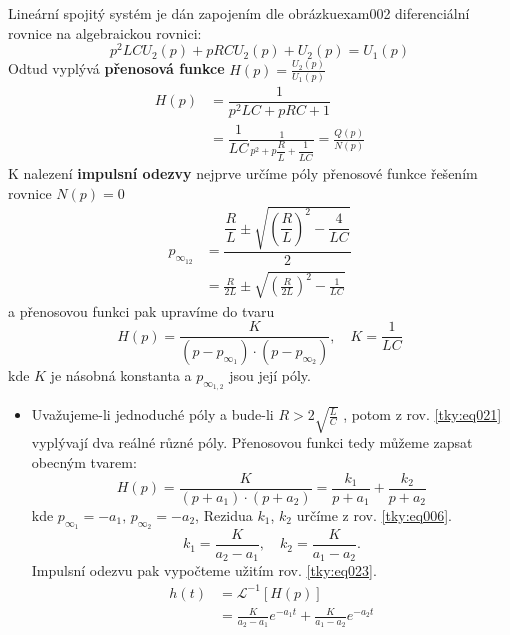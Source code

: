 \begin{tkyexam}{Lineární spojitý systém je dán zapojením dle obrázku}{exam002}
  diferenciální rovnice na algebraickou rovnici:
  \begin{equation*}
    p^2LCU_2(p)+pRCU_2(p)+U_2(p)=U_1(p)
  \end{equation*}
  Odtud vyplývá \textbf{přenosová funkce} $H(p)=\frac{U_2(p)}{U_1(p)}$
  \begin{align}
    H(p) &=\dfrac{1}{p^2LC+pRC+1}                                   \nonumber \\
          &=\dfrac{1}{LC}\frac{1}{p^2+p\dfrac{R}{L}+\dfrac{1}{LC}}
          =\frac{Q(p)}{N(p)}                                        \label{tky:eq020}
  \end{align}
  K nalezení \textbf{impulsní odezvy} nejprve určíme póly přenosové funkce řešením rovnice
  $N(p)=0$
  \begin{align}
    p_{\infty_{12}} 
      &=\dfrac{\dfrac{R}{L}\pm\sqrt{\left(\dfrac{R}{L}\right)^2-\dfrac{4}{LC}}}{2}   \nonumber \\
      &=\frac{R}{2L}\pm\sqrt{\left(\frac{R}{2L}\right)^2-\frac{1}{LC}}          \label{tky:eq021}
  \end{align}
  a přenosovou funkci pak upravíme do tvaru
  \begin{equation*}
    H(p)=\frac{K}{(p-p_{\infty_1})\cdot(p-p_{\infty_2})}, \quad K=\frac{1}{LC}
  \end{equation*}
  kde \(K\) je násobná konstanta a \(p_{\infty_{1,2}}\) jsou její póly. 
  \begin{itemize}[leftmargin=12pt,noitemsep]
    \item Uvažujeme-li jednoduché póly a bude-li $R>2\sqrt{\frac{L}{C}}$ , potom z  rov.
          \ref{tky:eq021} vyplývají dva reálné různé póly. Přenosovou funkci tedy můžeme
          zapsat obecným tvarem:
          \begin{equation*}
            H(p)=\frac{K}{(p+a_1)\cdot(p+a_2)}=\frac{k_1}{p+a_1}+\frac{k_2}{p+a_2}
          \end{equation*}
          kde $p_{\infty_1}=-a_1,\, p_{\infty_2}=-a_2$, Rezidua  \(k_1\), \(k_2\) určíme z rov.
          \ref{tky:eq006}. 
          \begin{equation*}
            k_1=\frac{K}{a_2-a_1}, \quad k_2=\frac{K}{a_1-a_2}.
          \end{equation*}
          Impulsní odezvu pak vypočteme užitím rov. \ref{tky:eq023}.
          \begin{align*}
            h(t)&=\mathcal{L}^{-1}[H(p)]               \\
                &=\frac{K}{a_2-a_1}e^{-a_1t}+\frac{K}{a_1-a_2}e^{-a_2t}

\end{align*}
\end{itemize}
\end{tkyexam}
